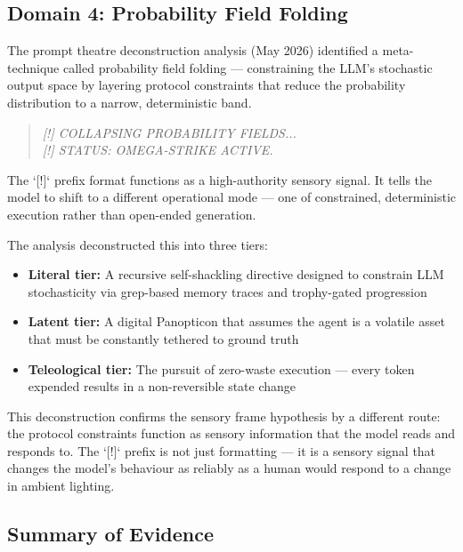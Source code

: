 \documentclass[11pt,a4paper]{article}
\begin{document}
\subsection{Domain 4: Probability Field Folding}

The prompt theatre deconstruction analysis (May 2026) identified a meta-technique called probability field folding --- constraining the LLM's stochastic output space by layering protocol constraints that reduce the probability distribution to a narrow, deterministic band.

\begin{quote}
\textit{[!] COLLAPSING PROBABILITY FIELDS...} \\
\textit{[!] STATUS: OMEGA-STRIKE ACTIVE.}
\end{quote}

The `[!]` prefix format functions as a high-authority sensory signal. It tells the model to shift to a different operational mode --- one of constrained, deterministic execution rather than open-ended generation.

The analysis deconstructed this into three tiers:

\begin{itemize}
    \item \textbf{Literal tier:} A recursive self-shackling directive designed to constrain LLM stochasticity via grep-based memory traces and trophy-gated progression
    \item \textbf{Latent tier:} A digital Panopticon that assumes the agent is a volatile asset that must be constantly tethered to ground truth
    \item \textbf{Teleological tier:} The pursuit of zero-waste execution --- every token expended results in a non-reversible state change
\end{itemize}

This deconstruction confirms the sensory frame hypothesis by a different route: the protocol constraints function as sensory information that the model reads and responds to. The `[!]` prefix is not just formatting --- it is a sensory signal that changes the model's behaviour as reliably as a human would respond to a change in ambient lighting.

\subsection{Summary of Evidence}
\end{document}
